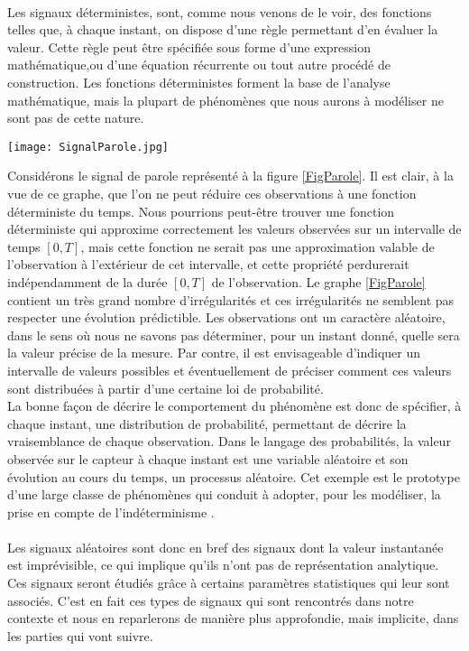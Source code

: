 \paragraph{}
Les signaux déterministes, sont, comme nous venons de le voir, des fonctions telles que, à chaque instant, on dispose d'une règle permettant d'en évaluer la valeur. Cette règle peut être spécifiée sous forme d'une expression mathématique,ou d'une équation récurrente ou tout autre procédé de construction.
Les fonctions déterministes forment la base de l'analyse mathématique, mais la plupart de phénomènes que nous aurons à modéliser ne sont pas de cette nature.\newpage
\begin{center}
\texttt{[image: SignalParole.jpg]}
\label{FigParole}
\end{center}
Considérons le signal de parole représenté à la figure \ref{FigParole}. Il est clair, à la vue de ce graphe, que l'on ne peut réduire ces observations à une fonction déterministe du temps. Nous pourrions peut-être trouver une fonction déterministe qui approxime correctement les valeurs observées sur un intervalle de temps $ [0,T] $, mais cette fonction ne serait pas une approximation valable de l'observation à l'extérieur de cet intervalle, et cette propriété perdurerait indépendamment de la durée $ [0,T] $ de l'observation. Le graphe \ref{FigParole} contient un très grand nombre d'irrégularités et ces irrégularités ne semblent pas respecter une évolution prédictible. Les observations ont un caractère aléatoire, dans le sens où nous ne savons pas déterminer, pour un instant donné, quelle sera la valeur précise de la mesure. Par contre, il est envisageable d'indiquer un intervalle de valeurs possibles et éventuellement de préciser comment ces valeurs sont distribuées à partir d'une certaine loi de probabilité.\\
La bonne façon de décrire le comportement du phénomène est donc de spécifier, à chaque instant, une distribution de probabilité, permettant de décrire la vraisemblance de chaque observation. Dans le langage des probabilités, la valeur observée sur le capteur à chaque instant est une variable aléatoire et son évolution au cours du temps, un processus aléatoire. Cet exemple est le prototype d'une large classe de phénomènes qui conduit à adopter, pour les modéliser, la prise en compte de l'indéterminisme \cite{Tsa}.
\paragraph{}
Les signaux aléatoires sont donc en bref des signaux dont la valeur instantanée est imprévisible, ce qui implique qu'ils n'ont pas de représentation analytique. Ces signaux seront étudiés grâce à certains paramètres statistiques qui leur sont associés. C'est en fait ces types de signaux qui sont rencontrés dans notre contexte et nous en reparlerons de manière plus approfondie, mais implicite, dans les parties qui vont suivre.

